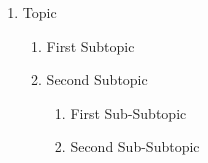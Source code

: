 \documentclass{article}
\begin{document}
\begin{enumerate}
  \item Topic
  \begin{enumerate}[label*=\arabic*.]
    \item First Subtopic
    \item Second Subtopic
    \begin{enumerate}[label*=\arabic*.]
      \item First Sub-Subtopic
      \item Second Sub-Subtopic
    \end{enumerate}
  \end{enumerate}
\end{enumerate}
\end{document}
